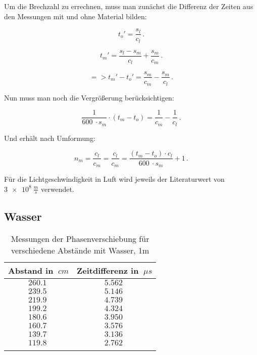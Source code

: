 Um die Brechzahl zu errechnen, muss man zunächst die Differenz der Zeiten aus den Messungen mit und ohne Material bilden:

\begin{equation}
    t_o' = \frac{s_l}{c_l}\,.
\end{equation}

\begin{equation}
    t_m' = \frac{s_l - s_m}{c_l} + \frac{s_m}{c_m}\,.
\end{equation}

\begin{equation}
   => t_m' - t_o' = \frac{s_m}{c_m} - \frac{s_m}{c_l}\,.
\end{equation}

Nun muss man noch die Vergrößerung berücksichtigen:

\begin{equation}
    \frac{1}{\SI{600}{} \cdot s_m} \cdot (t_m - t_o) = \frac{1}{c_m} - \frac{1}{c_l}\,.
\end{equation}

Und erhält nach Umformung:

\begin{equation}
    n_m = \frac{c_l}{c_m} = \frac{c_l}{c_m} = \frac{(t_m - t_o) \cdot c_l}{\SI{600}{} \cdot s_m} + 1\,.
\end{equation}

Für die Lichtgeschwindigkeit in Luft wird jeweils der Literaturwert von $\SI{3e8}{\frac{m}{s}}$ verwendet.

\subsection{Wasser}

\begin{table}[h!]
    \begin{center}
        \caption{Messungen der Phasenverschiebung für verschiedene Abstände mit Wasser, 1m}
        \begin{tabular}{cc}
            \hline
            Abstand in $\SI{}{cm}$ & Zeitdifferenz in $\SI{}{\mu s}$ \\
            \hline
            $\SI{260,1}{}$    & $\SI{5,562}{}$ \\
            $\SI{239,5}{}$    & $\SI{5,146}{}$ \\
            $\SI{219,9}{}$    & $\SI{4,739}{}$ \\
            $\SI{199,2}{}$    & $\SI{4,324}{}$ \\
            $\SI{180,6}{}$    & $\SI{3,950}{}$ \\
            $\SI{160,7}{}$    & $\SI{3,576}{}$ \\
            $\SI{139,7}{}$    & $\SI{3,136}{}$ \\
            $\SI{119,8}{}$    & $\SI{2,762}{}$ \\
            \hline
            \label{tab:Messwerte-Zeitdiffernz-Abstand-Wasser}
        \end{tabular}
    \end{center}
\end{table}


